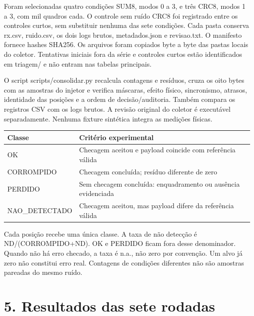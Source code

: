 \documentclass[11pt,a4paper]{article}
\begin{document}
Foram selecionadas quatro condições SUM8, modos 0 a 3, e três CRC8, modos 1 a 3, com mil quadros cada. O controle sem ruído CRC8 foi registrado entre os controles curtos, sem substituir nenhuma das sete condições. Cada pasta conserva rx.csv, ruido.csv, os dois logs brutos, metadados.json e revisao.txt. O manifesto fornece hashes SHA256. Os arquivos foram copiados byte a byte das pastas locais do coletor. Tentativas iniciais fora da série e controles curtos estão identificados em triagem/ e não entram nas tabelas principais.


O script scripts/consolidar.py recalcula contagens e resíduos, cruza os oito bytes com as amostras do injetor e verifica máscaras, efeito físico, sincronismo, atrasos, identidade das posições e a ordem de decisão/auditoria. Também compara os registros CSV com os logs brutos. A revisão original do coletor é executável separadamente. Nenhuma fixture sintética integra as medições físicas.


\begin{longtable}{>{\raggedright\arraybackslash}p{2.81cm}>{\raggedright\arraybackslash}p{12.39cm}}

Classe & Critério experimental \\ \hline\endhead

OK & Checagem aceitou e payload coincide com referência válida \\ 

CORROMPIDO & Checagem concluída; resíduo diferente de zero \\ 

PERDIDO & Sem checagem concluída: enquadramento ou ausência evidenciada \\ 

NAO\_DETECTADO & Checagem aceitou, mas payload difere da referência válida \\ 

\end{longtable}

Cada posição recebe uma única classe. A taxa de não detecção é ND/(CORROMPIDO+ND). OK e PERDIDO ficam fora desse denominador. Quando não há erro checado, a taxa é n.a., não zero por convenção. Um alvo já zero não constitui erro real. Contagens de condições diferentes não são amostras pareadas do mesmo ruído.


\section*{5. Resultados das sete rodadas}
\end{document}
